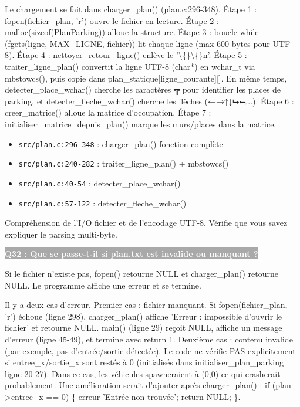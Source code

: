 \documentclass[12pt,a4paper]{article}
\newcommand{\question}[1]{%
    \vspace{0.5cm}
    \noindent\colorbox{darkgray}{\textcolor{white}{\textbf{#1}}}
    \vspace{0.3cm}
}
\begin{document}
\begin{reponse_longue}
Le chargement se fait dans charger\_plan() (plan.c:296-348). Étape 1 : fopen(fichier\_plan, 'r') ouvre le fichier en lecture. Étape 2 : malloc(sizeof(PlanParking)) alloue la structure. Étape 3 : boucle while (fgets(ligne, MAX\_LIGNE, fichier)) lit chaque ligne (max 600 bytes pour UTF-8). Étape 4 : nettoyer\_retour\_ligne() enlève le '\textbackslash\{\}\textbackslash\{\}n'. Étape 5 : traiter\_ligne\_plan() convertit la ligne UTF-8 (char*) en wchar\_t via mbstowcs(), puis copie dans plan\_statique[ligne\_courante][]. En même temps, detecter\_place\_wchar() cherche les caractères ╦ pour identifier les places de parking, et detecter\_fleche\_wchar() cherche les flèches (←→↑↓⮡⮢...). Étape 6 : creer\_matrice() alloue la matrice d'occupation. Étape 7 : initialiser\_matrice\_depuis\_plan() marque les murs/places dans la matrice.
\end{reponse_longue}

\begin{reference_code}
\begin{itemize}
    \item \texttt{src/plan.c:296-348} : charger\_plan() fonction complète
    \item \texttt{src/plan.c:240-282} : traiter\_ligne\_plan() + mbstowcs()
    \item \texttt{src/plan.c:40-54} : detecter\_place\_wchar()
    \item \texttt{src/plan.c:57-122} : detecter\_fleche\_wchar()
\end{itemize}
\end{reference_code}

\begin{objectif_prof}
Compréhension de l'I/O fichier et de l'encodage UTF-8. Vérifie que vous savez expliquer le parsing multi-byte.
\end{objectif_prof}

\question{Q32 : Que se passe-t-il si plan.txt est invalide ou manquant ?}

\begin{reponse_courte}
Si le fichier n'existe pas, fopen() retourne NULL et charger\_plan() retourne NULL. Le programme affiche une erreur et se termine.
\end{reponse_courte}

\begin{reponse_longue}
Il y a deux cas d'erreur. Premier cas : fichier manquant. Si fopen(fichier\_plan, 'r') échoue (ligne 298), charger\_plan() affiche 'Erreur : impossible d'ouvrir le fichier' et retourne NULL. main() (ligne 29) reçoit NULL, affiche un message d'erreur (ligne 45-49), et termine avec return 1. Deuxième cas : contenu invalide (par exemple, pas d'entrée/sortie détectée). Le code ne vérifie PAS explicitement si entree\_x/sortie\_x sont restés à 0 (initialisés dans initialiser\_plan\_parking ligne 20-27). Dans ce cas, les véhicules spawneraient à (0,0) ce qui crasherait probablement. Une amélioration serait d'ajouter après charger\_plan() : if (plan->entree\_x == 0) \{ erreur 'Entrée non trouvée'; return NULL; \}.
\end{reponse_longue}
\end{document}
